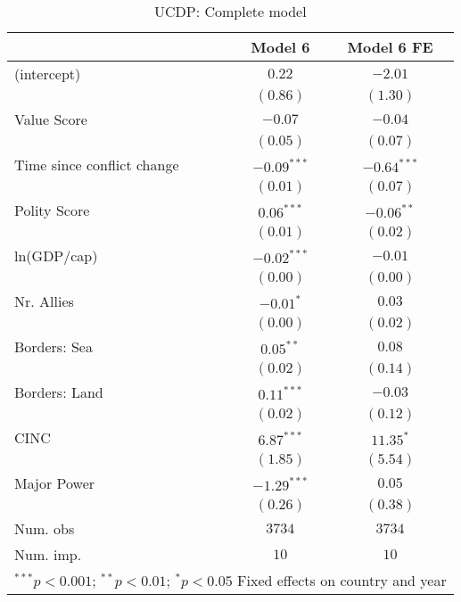 
\begin{table}
\begin{center}
\begin{tabular}{l c c}
\toprule
 & Model 6 & Model 6 FE \\
\midrule
(intercept)                & $0.22$        & $-2.01$       \\
                           & $(0.86)$      & $(1.30)$      \\
Value Score                & $-0.07$       & $-0.04$       \\
                           & $(0.05)$      & $(0.07)$      \\
Time since conflict change & $-0.09^{***}$ & $-0.64^{***}$ \\
                           & $(0.01)$      & $(0.07)$      \\
Polity Score               & $0.06^{***}$  & $-0.06^{**}$  \\
                           & $(0.01)$      & $(0.02)$      \\
ln(GDP/cap)                & $-0.02^{***}$ & $-0.01$       \\
                           & $(0.00)$      & $(0.00)$      \\
Nr. Allies                 & $-0.01^{*}$   & $0.03$        \\
                           & $(0.00)$      & $(0.02)$      \\
Borders: Sea               & $0.05^{**}$   & $0.08$        \\
                           & $(0.02)$      & $(0.14)$      \\
Borders: Land              & $0.11^{***}$  & $-0.03$       \\
                           & $(0.02)$      & $(0.12)$      \\
CINC                       & $6.87^{***}$  & $11.35^{*}$   \\
                           & $(1.85)$      & $(5.54)$      \\
Major Power                & $-1.29^{***}$ & $0.05$        \\
                           & $(0.26)$      & $(0.38)$      \\
\midrule
Num. obs                   & $3734$        & $3734$        \\
Num. imp.                  & $10$          & $10$          \\
\bottomrule
\multicolumn{3}{l}{\scriptsize{$^{***}p<0.001$; $^{**}p<0.01$; $^{*}p<0.05$ 
 Fixed effects on country and year}}
\end{tabular}
\caption{UCDP: Complete model}
\label{UCDP_3}
\end{center}
\end{table}
